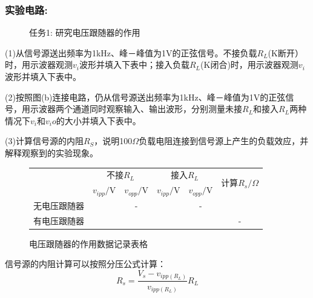 \documentclass[a4paper,11pt,UTF8]{article}
\begin{document}
\subsubsection{实验电路:}
\begin{figure}[H]
	\centering
	\setcounter{subfigure}{0}
	\caption*{任务1: 研究电压跟随器的作用}
\end{figure}
(1)从信号源送出频率为1kHz、峰－峰值为1V的正弦信号。不接负载$R_L$(K断开）时，用示波器观测$v_i$波形并填入下表中；接入负载$R_L$(K闭合)时，用示波器观测$v_i$波形并填入下表中。

(2)按照图(b)连接电路，仍从信号源送出频率为1kHz、峰－峰值为1V的正弦信号，用示波器两个通道同时观察输入、输出波形，分别测量未接$R_L$和接入$R_L$两种情况下$v_i$和$v_io$的大小并填入下表中。

(3)计算信号源的内阻$R_S$，说明100$\Omega$负载电阻连接到信号源上产生的负载效应，并解释观察到的实验现象。
\begin{figure}[H]
	\centering
	\caption*{电压跟随器的作用数据记录表格}
	
	\begin{tabular}{|c|c|c|c|c|c|}
		\hline
		\multirow{2}{*}{}   & \multicolumn{2}{c|}{不接$R_L$} & \multicolumn{2}{c|}{接入$R_L$} &
		\multirow{2}{*}{计算$R_s/\Omega$}\\
		\cline{2-5}
		\multirow{2}{*}{} & $v_{ipp}/$V & $v_{opp}/$V & $v_{ipp}/$V & $v_{opp}/$V & \multirow{2}{*}{}\\
		\hline
		无电压跟随器 &  & - &  & - &  \\
		\hline
		有电压跟随器 &  &  &  &  & - \\
		\hline
	\end{tabular}
	\label{table_MAP}
\end{figure}
信号源的内阻计算可以按照分压公式计算：
$$
	R_s=\frac{V_s-v_{ipp(R_L)}}{v_{ipp(R_L)}}R_L
$$
\end{document}

